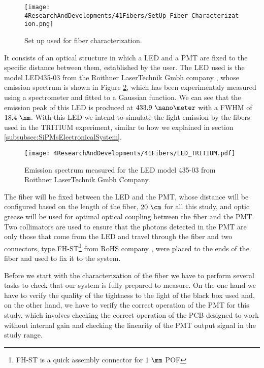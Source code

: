 \begin{figure}[h]
\centering
\texttt{[image: 4ResearchAndDevelopments/41Fibers/SetUp\_Fiber\_Characterization.png]}
\caption{Set up used for fiber characterization.\label{fig:SetUpFiberCharacterization}}
\end{figure}

It consists of an optical structure in which a LED and a PMT are fixed to the specific distance between them, established by the user. The LED used is the model LED435-03 from the Roithner LaserTechnik Gmbh company \cite{LEDRLT}, whose emission spectrum is shown in Figure \ref{fig:LEDSpectrumTritium}, which has been experimentaly measured using a spectrometer and fitted to a Gaussian function. We can see that the emission peak of this LED is produced at $433.9~\nano\meter$ with a FWHM of $18.4~\nm$. With this LED we intend to simulate the light emission by the fibers used in the TRITIUM experiment, similar to how we explained in section \ref{subsubsec:SiPMsElectronicalSystem}.

\begin{figure}[h]
\centering
\texttt{[image: 4ResearchAndDevelopments/41Fibers/LED\_TRITIUM.pdf]}
\caption{Emission spectrum measured for the LED model 435-03 from Roithner LaserTechnik Gmbh Company.\label{fig:LEDSpectrumTritium}}
\end{figure}

The fiber will be fixed between the LED and the PMT, whose distance will be configured based on the length of the fiber, $20~\cm$ for all this study, and optic grease \cite{OpticalGrease} will be used for optimal optical coupling between the fiber and the PMT. Two collimators are used to ensure that the photons detected in the PMT are only those that come from the LED and travel through the fiber and two connectors, type FH-ST\footnote{FH-ST is a quick assembly connector for $1~\mm$ POF} from RoHS company \cite{}, were placed to the ends of the fiber and used to fix it to the system. 

Before we start with the characterization of the fiber we have to perform several tasks to check that our system is fully prepared to measure. On the one hand we have to verify the quality of the tightness to the light of the black box used and, on the other hand, we have to verify the correct operation of the PMT for this study, which involves checking the correct operation of the PCB designed to work without internal gain and checking the linearity of the PMT output signal in the study range.


